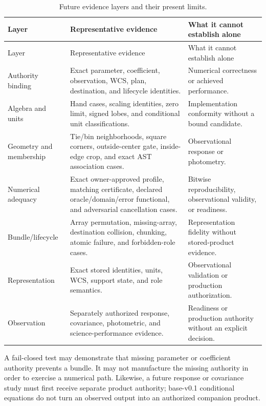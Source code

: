 \documentclass[11pt]{article}
\begin{document}
\begin{longtable}{@{}>{\raggedright\arraybackslash}p{}
                        >{\raggedright\arraybackslash}p{}
                        >{\raggedright\arraybackslash}p{}@{}}
\caption{Future evidence layers and their present limits.}\label{tab:evidence-layers}\\
\toprule
Layer & Representative evidence & What it cannot establish alone \\
\midrule
\endfirsthead
\toprule
Layer & Representative evidence & What it cannot establish alone \\
\midrule
\endhead
Authority binding & Exact parameter, coefficient, observation, WCS, plan,
destination, and lifecycle identities. & Numerical correctness or achieved
performance. \\
Algebra and units & Hand cases, scaling identities, zero limit, signed lobes,
and conditional unit classifications. & Implementation conformity without a
bound candidate. \\
Geometry and membership & Tie/bin neighborhoods, square corners, outside-center
gate, inside-edge crop, and exact AST association cases. & Observational
response or photometry. \\
Numerical adequacy & Exact owner-approved profile, matching certificate,
declared oracle/domain/error functional, and adversarial cancellation cases. &
Bitwise reproducibility, observational validity, or readiness. \\
Bundle/lifecycle & Array permutation, missing-array, destination collision,
chunking, atomic failure, and forbidden-role cases. & Representation fidelity
without stored-product evidence. \\
Representation & Exact stored identities, units, WCS, support state, and role
semantics. & Observational validation or production authorization. \\
Observation & Separately authorized response, covariance, photometric, and
science-performance evidence. & Readiness or production authority without an
explicit decision. \\
\bottomrule
\end{longtable}

A fail-closed test may demonstrate that missing parameter or coefficient
authority prevents a bundle.  It may not manufacture the missing authority in
order to exercise a numerical path.  Likewise, a future response or covariance
study must first receive separate product authority; base-v0.1 conditional
equations do not turn an observed output into an authorized companion product.
\end{document}
